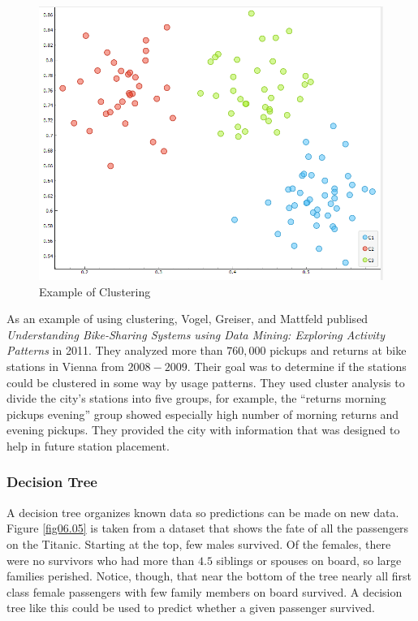 \begin{figure}[H]
	\centering
	\includegraphics[width=\maxwidth{.95\linewidth}]{gfx/06-Cluster}
	\caption{Example of Clustering}
	\label{fig06.11}
\end{figure}

As an example of using clustering, Vogel, Greiser, and Mattfeld publised \textit{Understanding Bike-Sharing Systems using Data Mining: Exploring Activity Patterns}\cite{vogel2011understanding} in 2011. They analyzed more than $ 760,000 $ pickups and returns at bike stations in Vienna from $ 2008-2009 $. Their goal was to determine if the stations could be clustered in some way by usage patterns. They used cluster analysis to divide the city's stations into five groups, for example, the ``returns morning pickups evening'' group showed especially high number of morning returns and evening pickups. They provided the city with information that was designed to help in future station placement.

\subsubsection{Decision Tree}

A decision tree organizes known data so predictions can be made on new data. Figure \ref{fig06.05} is taken from a dataset that shows the fate of all the passengers on the Titanic. Starting at the top, few males survived. Of the females, there were no survivors who had more than $ 4.5 $ siblings or spouses on board, so large families perished. Notice, though, that near the bottom of the tree nearly all first class female passengers with few family members on board survived. A decision tree like this could be used to predict whether a given passenger survived. 

